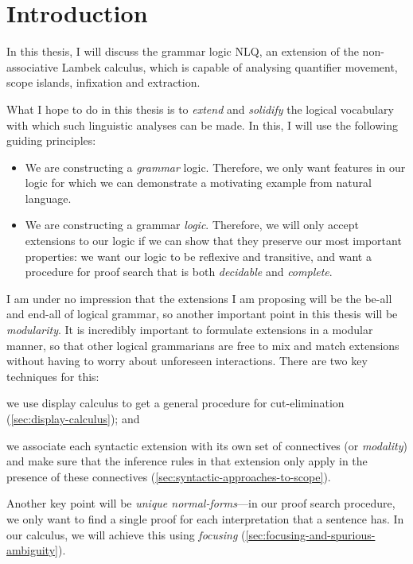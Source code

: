 \section{Introduction}
\label{sec:introduction}

In this thesis, I will discuss the grammar logic NLQ, an extension of
the non-associative Lambek calculus, which is capable of analysing
quantifier movement, scope islands, infixation and extraction.

What I hope to do in this thesis is to \emph{extend} and
\emph{solidify} the logical vocabulary with which such linguistic
analyses can be made. In this, I will use the following guiding
principles:
\begin{itemize}
\item We are constructing a \emph{grammar} logic. Therefore, we only
  want features in our logic for which we can demonstrate a motivating
  example from natural language.
\item We are constructing a grammar \emph{logic}. Therefore, we will
  only accept extensions to our logic if we can show that they
  preserve our most important properties: we want our logic to be
  reflexive and transitive, and want a procedure for proof
  search that is both \emph{decidable} and \emph{complete}.
\end{itemize}
I am under no impression that the extensions I am proposing will be
the be-all and end-all of logical grammar, so another important point
in this thesis will be \emph{modularity}.
It is incredibly important to formulate extensions in a modular
manner, so that other logical grammarians are free to mix and
match extensions without having to worry about unforeseen
interactions. There are two key techniques for this:
\begin{enumerate*}[label=(\arabic*)]
\item
  we use display calculus to get a general procedure for
  cut-elimination (\autoref{sec:display-calculus}); and
\item
  we associate each syntactic extension with its own set of
  connectives (or \emph{modality}) and make sure that the inference
  rules in that extension only apply in the presence of these
  connectives (\autoref{sec:syntactic-approaches-to-scope}).
\end{enumerate*}

Another key point will be \emph{unique normal-forms}---in our proof
search procedure, we only want to find a single proof for each
interpretation that a sentence has. In our calculus, we will achieve
this using \emph{focusing}
(\autoref{sec:focusing-and-spurious-ambiguity}).

